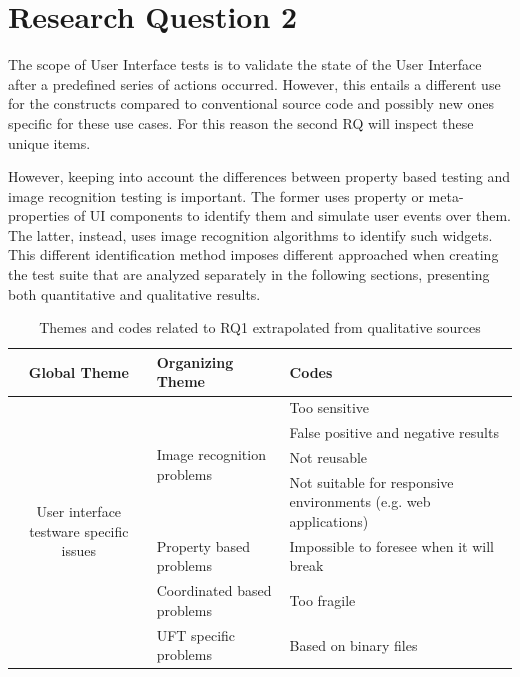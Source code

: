 \FloatBarrier

\section{Research Question 2}
%
The scope of User Interface tests is to validate the state of the User Interface after a predefined series of actions occurred. However, this entails a different use for the constructs compared to conventional source code and possibly new ones specific for these use cases. For this reason the second RQ will inspect these unique items.

However, keeping into account the differences between property based testing and image recognition testing is important. The former uses property or meta-properties of UI components to identify them and simulate user events over them. The latter, instead, uses image recognition algorithms to identify such widgets. This different identification method imposes different approached when creating the test suite that are analyzed separately in the following sections, presenting both quantitative and qualitative results.



\begin{table}
\renewcommand{\arraystretch}{1.5}
\centering
\begin{tabular}{ c p{4.3cm} p{4.6cm}}

    \hline
    {\large Global Theme} & {\large Organizing Theme} & {\large Codes}\\
    \hline

    \multirow{7}{*}{\parbox[b]{4.3cm}{
        User interface testware specific issues
    }
    } & \multirow{4}{*}{\parbox[c]{4.3cm}{Image recognition problems}}
        & Too sensitive \\
        & & False positive and negative results\\
        & & Not reusable\\
        & & Not suitable for responsive environments (e.g. web applications)\\ \cline{2-3}

    & Property based problems & Impossible to foresee when it will break\\ \cline{2-3}

    & Coordinated based problems  & Too fragile\\ \cline{2-3}

    & UFT specific problems & Based on binary files\\

    \hline
\end{tabular}
\caption{Themes and codes related to RQ1 extrapolated from qualitative sources}
\label{tab:themes_rq2}
\end{table}

